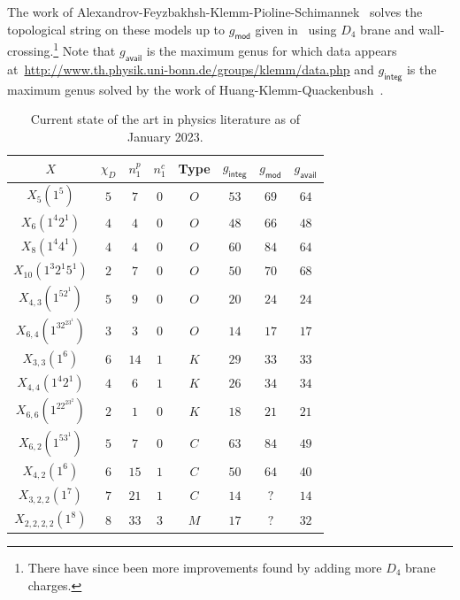 \documentclass[10pt]{amsart}
\theoremstyle{definition}
\theoremstyle{remark}
\theoremstyle{plain}
\theoremstyle{definition}
\theoremstyle{remark}
\newcommand{\ms}[1]{\mathsf{#1}}
\newcommand{\1}{\mathbf{1}}
\newcommand{\2}{\mathbf{2}}
\newcommand{\3}{\mathbf{3}}
\begin{document}
The work of Alexandrov-Feyzbakhsh-Klemm-Pioline-Schimannek~\cite{qgeommod} solves the topological string on these models up to $g_{\ms{mod}}$ given in~ using $D_4$ brane and wall-crossing.\footnote{There have since been more improvements found by adding more $D_4$ brane charges.} Note that $g_{\ms{avail}}$ is the maximum genus for which data appears at~\url{http://www.th.physik.uni-bonn.de/groups/klemm/data.php} and $g_{\ms{integ}}$ is the maximum genus solved by the work of Huang-Klemm-Quackenbush~\cite{hkq}. 
\begin{table}[htpb]
    \centering
    \caption{Current state of the art in physics literature as of January 2023.}
    \label{tab:stateofart}
    \begin{tabular}{cccccccc}
        \toprule
        $X$                   & $\chi_D$ & $n_1^p$ & $n_1^c$ & Type & $g_{\ms{integ}}$ & $g_{\ms{mod}}$ & $g_{\ms{avail}}$ \\
        \midrule
        $X_5(1^5)$            & $5$ & $7$ & $0$ & $O$ & $53$ & $69$ & $64$ \\
        $X_6(1^4 2^1)$        & $4$ & $4$ & $0$ & $O$ & $48$ & $66$ & $48$ \\
        $X_8(1^4 4^1)$        & $4$ & $4$ & $0$ & $O$ & $60$ & $84$ & $64$ \\
        $X_{10}(1^3 2^1 5^1)$ & $2$ & $7$ & $0$ & $O$ & $50$ & $70$ & $68$ \\
        $X_{4,3}(1^52^1)$     & $5$ & $9$ & $0$ & $O$ & $20$ & $24$ & $24$ \\
        $X_{6,4}(1^32^23^1)$  & $3$ & $3$ & $0$ & $O$ & $14$ & $17$ & $17$ \\
        $X_{3,3}(1^6)$        & $6$ & $14$ & $1$ & $K$ & $29$ & $33$ & $33$ \\
        $X_{4,4}(1^4 2^1)$    & $4$ & $6$ & $1$ & $K$ & $26$ & $34$ & $34$ \\
        $X_{6,6}(1^22^23^2)$  & $2$ & $1$ & $0$ & $K$ & $18$ & $21$ & $21$ \\
        $X_{6,2}(1^53^1)$     & $5$ & $7$ & $0$ & $C$ & $63$ & $84$ & $49$ \\
        $X_{4,2}(1^6)$        & $6$ & $15$ & $1$ & $C$ & $50$ & $64$ & $40$ \\
        $X_{3,2,2}(1^7)$      & $7$ & $21$ & $1$ & $C$ & $14$ & $?$ & $14$ \\
        $X_{2,2,2,2}(1^8)$    & $8$ & $33$ & $3$ & $M$ & $17$ & $?$ & $32$ \\
        \bottomrule
    \end{tabular}
\end{table}
\end{document}
